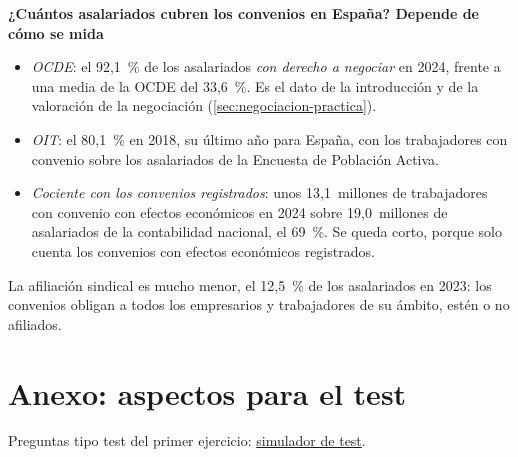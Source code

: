 \documentclass[11pt]{article}
\begin{document}
\begin{anotaciones}
\textbf{¿Cuántos asalariados cubren los convenios en España? Depende de cómo se mida}
\begin{itemize}
\item \emph{OCDE}: el 92,1~\% de los asalariados \emph{con derecho a negociar} en 2024, frente a una media de la OCDE del 33,6~\%\nocite{OCDE2026ICTWSSCobertura}. Es el dato de la introducción y de la valoración de la negociación (\ref{sec:negociacion-practica}).
\item \emph{OIT}: el 80,1~\% en 2018, su último año para España, con los trabajadores con convenio sobre los asalariados de la Encuesta de Población Activa\nocite{OIT2026ILOSTATSindicatos}.
\item \emph{Cociente con los convenios registrados}: unos 13,1~millones de trabajadores con convenio con efectos económicos en 2024 sobre 19,0~millones de asalariados de la contabilidad nacional, el 69~\%\nocite{MITES2026CCTOct,Eurostat2026NamaPe}. Se queda corto, porque solo cuenta los convenios con efectos económicos registrados.
\end{itemize}
La afiliación sindical es mucho menor, el 12,5~\% de los asalariados en 2023\nocite{OCDE2026ICTWSSAfiliacion}: los convenios obligan a todos los empresarios y trabajadores de su ámbito, estén o no afiliados\nocite{BOE2015ET}.
\end{anotaciones}

\section{Anexo: aspectos para el test}\label{anexo:test}

\begin{anotaciones}
Preguntas tipo test del primer ejercicio: \href{https://www.victorgutierrezmarcos.es/oposicion/temario/primer-ejercicio/test/simulador.html?tema=3.A.27}{simulador de test}.
\end{anotaciones}
\end{document}
